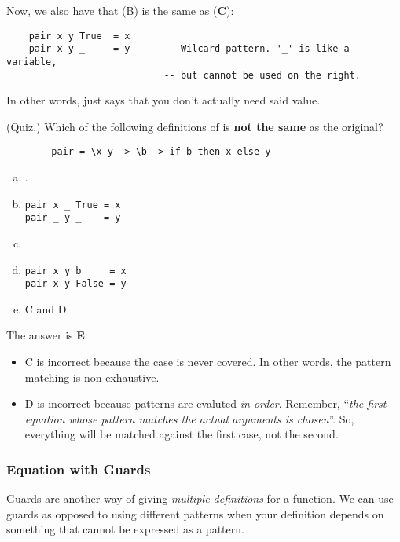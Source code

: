 \documentclass[letterpaper]{article}
\begin{document}
\bigskip 

Now, we also have that (B) is the same as (\textbf{C}): 
\begin{verbatim}
    pair x y True  = x      
    pair x y _     = y      -- Wilcard pattern. '_' is like a variable,
                            -- but cannot be used on the right. \end{verbatim}
In other words, \code{\_} just says that you don't actually need said value. 

\begin{mdframed}[]
    (Quiz.) Which of the following definitions of  is \textbf{not the same} as the original? 
    \begin{verbatim}
        pair = \x y -> \b -> if b then x else y \end{verbatim} 

    \begin{enumerate}[(a)]
        \item {}.
        \item \begin{verbatim}
pair x _ True = x 
pair _ y _    = y\end{verbatim}
        \item {}
        \item \begin{verbatim}
pair x y b     = x
pair x y False = y  \end{verbatim}
        \item C and D 
    \end{enumerate}

    \begin{mdframed}[]
        The answer is \textbf{E}. 
        \begin{itemize}
            \item C is incorrect because the  case is never covered. In other words, the pattern matching is non-exhaustive. 
            \item D is incorrect because patterns are evaluted \emph{in order}. Remember, ``\emph{the first equation whose pattern matches the actual arguments is chosen}''. So, everything will be matched against the first case, not the second.
        \end{itemize}
    \end{mdframed}
\end{mdframed}

\subsubsection{Equation with Guards}
Guards are another way of giving \emph{multiple definitions} for a function. We can use guards as opposed to using different patterns when your definition depends on something that cannot be expressed as a pattern.
\end{document}
